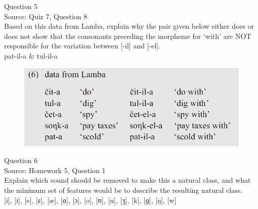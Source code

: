 \documentclass[12pt]{article}
\begin{document}
\newpage

{\large Question 5}\\

Source: Quiz 7, Question 8\\

Based on this data from Lamba, explain why the pair given below either does or does not show that the consonants preceding the morpheme for `with' are NOT responsible for the variation between [-il] and [-el].\\

pat-il-a \& tul-il-a

\begin{figure}[H]
\includegraphics{../images/peng119_lamba.png}
\end{figure}

\newpage

{\large Question 6}\\

Source: Homework 5, Question 1\\

Explain which sound should be removed to make this a natural class, and what the minimum set of features would be to describe the resulting natural class.\\

{[i]}, {[ɪ]}, {[e]}, {[ɛ]}, {[æ]}, {[ɑ]}, {[ɔ]}, {[o]}, {[ʊ]}, {[u]}, {[ʒ]}, {[k]}, {[ɡ]}, {[ŋ]}, {[w]}


\newpage

\begin{center}
\textbf{{\color{red}{\HUGE END OF EXAM}}}\\

\end{center}
\newpage

\begin{center}
\textbf{{\color{blue}{\HUGE START OF EXAM\\}}}

\textbf{{\color{blue}{\HUGE Student ID: 4220\\}}}

\textbf{{\color{blue}{\HUGE 12:30 - 12:50 PM\\}}}

\end{center}
\newpage
\end{document}
